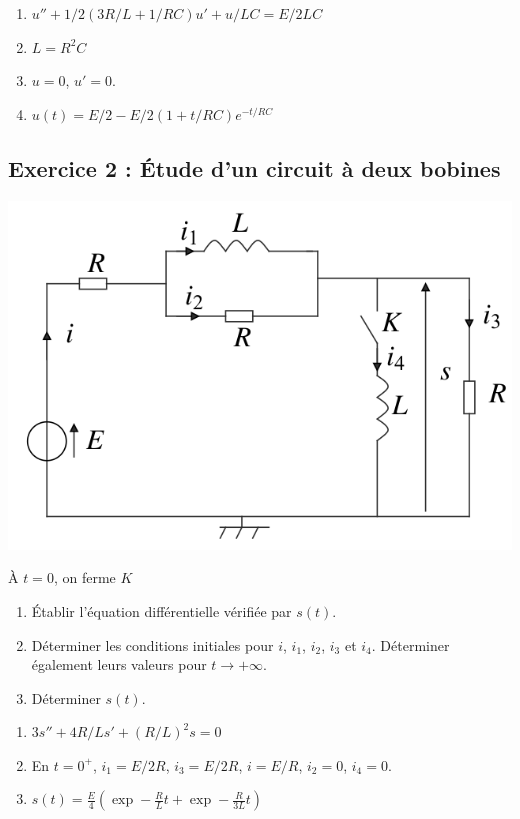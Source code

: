 \begin{enumerate}
	\item $u'' + 1/2(3R/L + 1/RC)u' + u/LC = E/2LC$
	\item $L = R^2 C$
	\item $u=0$, $u'=0$.
	\item $u(t) = E/2 - E/2(1+t/RC)e^{-t/RC}$
\end{enumerate}

\subsection{Exercice 2 : Étude d'un circuit à deux bobines}

\begin{minipage}[c]{\linewidth/2}
	\includegraphics[width=\textwidth]{./Images/mpsi_s08_ex02.png}
\end{minipage}%
\begin{minipage}[c]{\linewidth/2}
	À $t=0$, on ferme $K$
\end{minipage}

\begin{enumerate}
	\item Établir l'équation différentielle vérifiée par $s(t)$.
	\item Déterminer les conditions initiales pour $i$, $i_1$, $i_2$, $i_3$ et $i_4$. Déterminer également leurs valeurs pour $t\rightarrow+\infty$.
	\item Déterminer $s(t)$. 
\end{enumerate}

\begin{enumerate}
	\item $3s'' + 4R/L s' + (R/L)^2 s = 0$
	\item En $t=0^+$, $i_1=E/2R$, $i_3=E/2R$, $i=E/R$, $i_2=0$, $i_4=0$.
	\item $s(t) = \frac{E}{4} \left( \exp -\frac{R}{L}t +  \exp -\frac{R}{3L}t \right)$
\end{enumerate}


